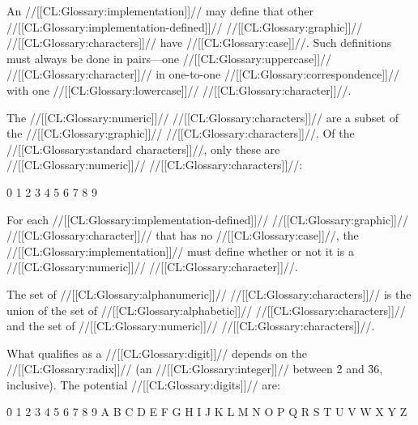 \endsubsubsubsection%


An //[[CL:Glossary:implementation]]// may define that other //[[CL:Glossary:implementation-defined]]// //[[CL:Glossary:graphic]]// //[[CL:Glossary:characters]]// have //[[CL:Glossary:case]]//.  Such definitions must always be done in pairs---one //[[CL:Glossary:uppercase]]// //[[CL:Glossary:character]]// in one-to-one  //[[CL:Glossary:correspondence]]// with one //[[CL:Glossary:lowercase]]// //[[CL:Glossary:character]]//.

\endsubsubsubsection%

\endsubsubsection%


The //[[CL:Glossary:numeric]]// //[[CL:Glossary:characters]]// are a subset of the //[[CL:Glossary:graphic]]// //[[CL:Glossary:characters]]//. Of the //[[CL:Glossary:standard characters]]//, only these are //[[CL:Glossary:numeric]]// //[[CL:Glossary:characters]]//:

\f{0 1 2 3 4 5 6 7 8 9}

For each //[[CL:Glossary:implementation-defined]]// //[[CL:Glossary:graphic]]// //[[CL:Glossary:character]]//  that has no //[[CL:Glossary:case]]//, the //[[CL:Glossary:implementation]]// must define whether or not it is a //[[CL:Glossary:numeric]]// //[[CL:Glossary:character]]//.

\endsubsubsection%


The set of //[[CL:Glossary:alphanumeric]]// //[[CL:Glossary:characters]]// is the union of 
    the set of //[[CL:Glossary:alphabetic]]// //[[CL:Glossary:characters]]//  and the set of //[[CL:Glossary:numeric]]// //[[CL:Glossary:characters]]//.

\endsubsubsection%

 

What qualifies as a //[[CL:Glossary:digit]]// depends on the //[[CL:Glossary:radix]]//  (an //[[CL:Glossary:integer]]// between \f{2} and \f{36}, inclusive). The potential //[[CL:Glossary:digits]]// are:

\f{0 1 2 3 4 5 6 7 8 9 A B C D E F G H I J K L M N O P Q R S T U V W X Y Z}


